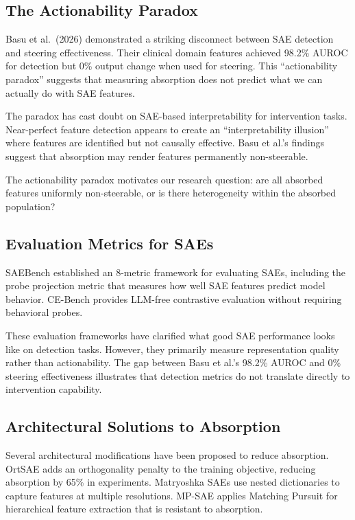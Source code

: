 \documentclass{article}
\begin{document}
\subsection{The Actionability Paradox}

Basu et al.\ (2026) demonstrated a striking disconnect between SAE detection and steering effectiveness. Their clinical domain features achieved 98.2\% AUROC for detection but 0\% output change when used for steering. This ``actionability paradox'' suggests that measuring absorption does not predict what we can actually do with SAE features.

The paradox has cast doubt on SAE-based interpretability for intervention tasks. Near-perfect feature detection appears to create an ``interpretability illusion'' where features are identified but not causally effective. Basu et al.'s findings suggest that absorption may render features permanently non-steerable.

The actionability paradox motivates our research question: are all absorbed features uniformly non-steerable, or is there heterogeneity within the absorbed population?

\subsection{Evaluation Metrics for SAEs}

SAEBench \citep{karvonen2025saebench} established an 8-metric framework for evaluating SAEs, including the probe projection metric that measures how well SAE features predict model behavior. CE-Bench \citep{peng2025cebench} provides LLM-free contrastive evaluation without requiring behavioral probes.

These evaluation frameworks have clarified what good SAE performance looks like on detection tasks. However, they primarily measure representation quality rather than actionability. The gap between Basu et al.'s 98.2\% AUROC and 0\% steering effectiveness illustrates that detection metrics do not translate directly to intervention capability.

\subsection{Architectural Solutions to Absorption}

Several architectural modifications have been proposed to reduce absorption. OrtSAE \citep{korznikov2025ortsae} adds an orthogonality penalty to the training objective, reducing absorption by 65\% in experiments. Matryoshka SAEs \citep{bussmann2025matryoshka} use nested dictionaries to capture features at multiple resolutions. MP-SAE \citep{costa2025mpsae} applies Matching Pursuit for hierarchical feature extraction that is resistant to absorption.
\end{document}
